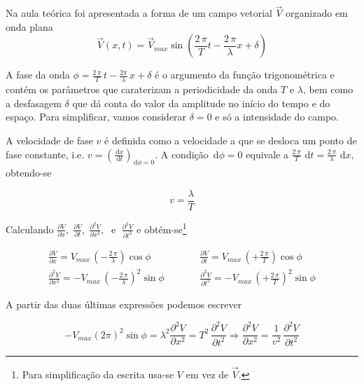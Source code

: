 \documentclass[a4paper,12pt]{article}
\newcommand{\ud}{\,\mathrm{d}}
\begin{document}
Na aula teórica foi apresentada a forma de um campo vetorial $\vec{V}$ organizado em onda plana 
\begin{equation}
	\label{eq:onda}
	\vec{V}(x,t)=\vec{V}_{max} \sin \left(\frac{2\,\pi}{T}t - \frac{2\,\pi}{\lambda}x + \delta \right)
\end{equation}

A fase da onda $\phi = \frac{2\,\pi}{T}\,t - \frac{2\pi}{\lambda}\,x + \delta$  é o argumento da função trigonométrica e contém os parâmetros que caraterizam a periodicidade da onda $T$ e $\lambda$, bem como a desfasagem $\delta$ que dá conta do valor da amplitude no início do tempo e do espaço. Para simplificar, vamos considerar $\delta=0$ e só a intensidade do campo.

A velocidade de fase $v$ é definida como a velocidade a que se desloca um ponto de fase constante, i.e.  $v=(\frac{\ud x}{\ud t})_{\ud \phi=0}$. A condição $\ud \phi = 0$ equivale a $\frac{2\,\pi}{T}\,\ud t = \frac{2\,\pi}{\lambda}\,\ud x$, obtendo-se

\begin{equation}
	\label{eq:v}
	v=\frac{\lambda}{T} 
\end{equation}

Calculando $\frac{\partial V }{\partial x}, \;\frac{\partial V }{\partial t}, \;\frac{\partial^2 V }{\partial x^2}, \; \textrm{ e } \;\frac{\partial^2 V }{\partial t^2} $   e    obtém-se\footnote{Para simplificação da escrita usa-se $V$ em vez de $\vec{V}$. }

\begin{equation}
\begin{array}{ccc}
\frac{\partial V }{\partial x} = V_{max} \, (-\frac{2\,\pi}{\lambda}) \cos \phi &\qquad& \frac{\partial V }{\partial t} = V_{max} \, (+\frac{2\,\pi}{T}) \cos \phi\\
%
\frac{\partial^2 V }{\partial x^2} = -V_{max} \, \left(-\frac{2\,\pi}{\lambda}\right)^2 \sin \phi &\qquad& \frac{\partial^2 V }{\partial t^2} = -V_{max} \, \left(+\frac{2\,\pi}{T}\right)^2 \sin \phi
\end{array}
\end{equation}

A partir das duas últimas expressões podemos escrever

\begin{equation}
	\label{eq:ondap}
-V_{max} (2 \pi)^2  \sin \phi = \lambda^2 \frac{\partial^2 V }{\partial x^2} = T^2 \, \frac{\partial^2 V }{\partial t^2} \Rightarrow 
\frac{\partial^2 V }{\partial x^2} = \frac{1}{v^2}  \, \frac{\partial^2 V }{\partial t^2}
\end{equation}
\end{document}

